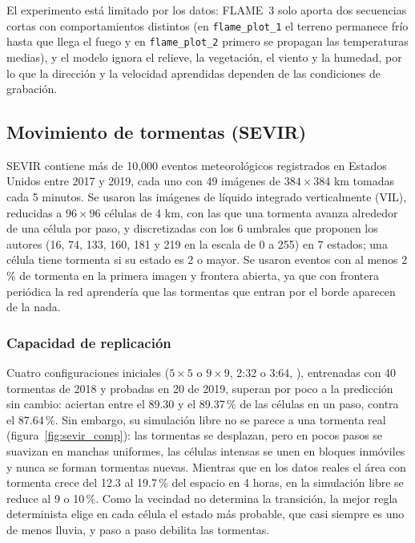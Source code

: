El experimento está limitado por los datos: FLAME~3 solo aporta dos secuencias cortas con comportamientos distintos (en \texttt{flame\_plot\_1} el terreno permanece frío hasta que llega el fuego y en \texttt{flame\_plot\_2} primero se propagan las temperaturas medias), y el modelo ignora el relieve, la vegetación, el viento y la humedad, por lo que la dirección y la velocidad aprendidas dependen de las condiciones de grabación.

\subsection{Movimiento de tormentas (SEVIR)}

SEVIR \cite{veillette2020sevir} contiene más de 10,000 eventos meteorológicos registrados en Estados Unidos entre 2017 y 2019, cada uno con 49 imágenes de $384\times384$ km tomadas cada 5 minutos. Se usaron las imágenes de líquido integrado verticalmente (VIL), reducidas a $96\times96$ células de 4 km, con las que una tormenta avanza alrededor de una célula por paso, y discretizadas con los 6 umbrales que proponen los autores (16, 74, 133, 160, 181 y 219 en la escala de 0 a 255) en 7 estados; una célula tiene tormenta si su estado es 2 o mayor. Se usaron eventos con al menos 2\,\% de tormenta en la primera imagen y frontera abierta, ya que con frontera periódica la red aprendería que las tormentas que entran por el borde aparecen de la nada.

\subsubsection{Capacidad de replicación}
Cuatro configuraciones iniciales ($5\times5$ o $9\times9$, 2:32 o 3:64, \onehot{}), entrenadas con 40 tormentas de 2018 y probadas en 20 de 2019, superan por poco a la predicción sin cambio: aciertan entre el 89.30 y el 89.37\,\% de las células en un paso, contra el 87.64\,\%. Sin embargo, su simulación libre no se parece a una tormenta real (figura~\ref{fig:sevir_comp}): las tormentas se desplazan, pero en pocos pasos se suavizan en manchas uniformes, las células intensas se unen en bloques inmóviles y nunca se forman tormentas nuevas. Mientras que en los datos reales el área con tormenta crece del 12.3 al 19.7\,\% del espacio en 4 horas, en la simulación libre se reduce al 9 o 10\,\%. Como la vecindad no determina la transición, la mejor regla determinista elige en cada célula el estado más probable, que casi siempre es uno de menos lluvia, y paso a paso debilita las tormentas.

